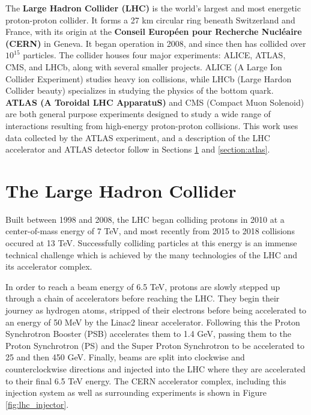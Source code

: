 \label{chapter:lhcatlas}

The \textbf{Large Hadron Collider (LHC)} is the world's largest and most energetic proton-proton collider. It forms a 27 km circular ring beneath Switzerland and France, with its origin at the \textbf{Conseil Européen pour Recherche Nucléaire (CERN)} in Geneva. It began operation in 2008, and since then has collided over $10^{15}$ particles. The collider houses four major experiments: ALICE, ATLAS, CMS, and LHCb, along with several smaller projects. ALICE (A Large Ion Collider Experiment) studies heavy ion collisions, while LHCb (Large Hardon Collider beauty) specializes in studying the physics of the bottom quark. \textbf{ATLAS (A Toroidal LHC ApparatuS)} and CMS (Compact Muon Solenoid) are both general purpose experiments designed to study a wide range of interactions resulting from high-energy proton-proton collisions. This work uses data collected by the ATLAS experiment, and a description of the LHC accelerator and ATLAS detector follow in Sections \ref{section:lhc} and \ref{section:atlas}.

\section{The Large Hadron Collider}
\label{section:lhc}
Built between 1998 and 2008, the LHC \cite{LHCDesign} began colliding protons in 2010 at a center-of-mass energy of 7 TeV, and most recently from 2015 to 2018 collisions occured at 13 TeV. Successfully colliding particles at this energy is an immense technical challenge which is achieved by the many technologies of the LHC and its accelerator complex.

In order to reach a beam energy of 6.5 TeV, protons are slowly stepped up through a chain of accelerators before reaching the LHC. They begin their journey as hydrogen atoms, stripped of their electrons before being accelerated to an energy of 50 MeV by the Linac2 linear accelerator. Following this the Proton Synchrotron Booster (PSB) accelerates them to 1.4 GeV, passing them to the Proton Synchrotron (PS) and the Super Proton Synchrotron to be accelerated to 25 and then 450 GeV. Finally, beams are split into clockwise and counterclockwise directions and injected into the LHC where they are accelerated to their final 6.5 TeV energy. The CERN accelerator complex, including this injection system as well as surrounding experiments is shown in Figure \ref{fig:lhc_injector}.

